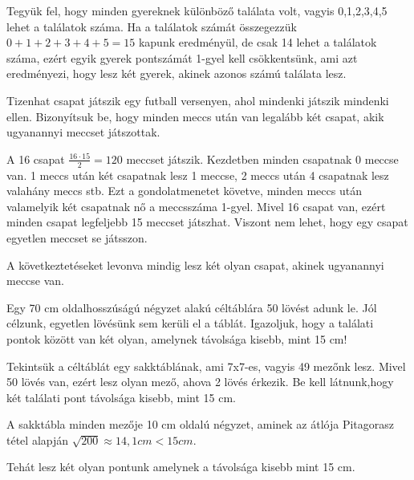 \begin{solution}
	Tegyük fel, hogy minden gyereknek különböző találata volt, vagyis
	0,1,2,3,4,5 lehet a találatok száma. Ha a találatok számát összegezzük
	$0+1+2+3+4+5=15$ kapunk eredményül, de csak 14 lehet a találatok
	száma, ezért egyik gyerek pontszámát 1-gyel kell csökkentsünk, ami
	azt eredményezi, hogy lesz két gyerek, akinek azonos számú találata
	lesz. 
\end{solution}
\begin{problem}
	Tizenhat csapat játszik egy futball versenyen, ahol mindenki játszik
	mindenki ellen. Bizonyítsuk be, hogy minden meccs után van legalább
	két csapat, akik ugyanannyi meccset játszottak. \\
	
\end{problem}

\begin{solution}
	A 16 csapat $\frac{16\cdot15}{2}=120$ meccset játszik. Kezdetben
	minden csapatnak 0 meccse van. 1 meccs után két csapatnak lesz 1 meccse,
	2 meccs után 4 csapatnak lesz valahány meccs stb. Ezt a gondolatmenetet
	követve, minden meccs után valamelyik két csapatnak nő a meccsszáma
	1-gyel. Mivel 16 csapat van, ezért minden csapat legfeljebb 15 meccset
	játszhat. Viszont nem lehet, hogy egy csapat egyetlen meccset se játsszon.
	
	A következtetéseket levonva mindig lesz két olyan csapat, akinek ugyanannyi
	meccse van. 
\end{solution}
\begin{problem}
	Egy 70 cm oldalhosszúságú négyzet alakú céltáblára 50 lövést adunk
	le. Jól célzunk, egyetlen lövésünk sem kerüli el a táblát. Igazoljuk,
	hogy a találati pontok között van két olyan, amelynek távolsága kisebb,
	mint 15 cm! \\
\end{problem}

\begin{solution}
	Tekintsük a céltáblát egy sakktáblának, ami 7x7-es, vagyis 49 mezőnk
	lesz. Mivel 50 lövés van, ezért lesz olyan mező, ahova 2 lövés érkezik.
	Be kell látnunk,hogy két találati pont távolsága kisebb, mint 15 cm.
	
	A sakktábla minden mezője 10 cm oldalú négyzet, aminek az átlója Pitagorasz
	tétel alapján $\sqrt{200}\approx14,1cm<15cm$.
	
	Tehát lesz két olyan pontunk amelynek a távolsága kisebb mint 15 cm.
\end{solution}

